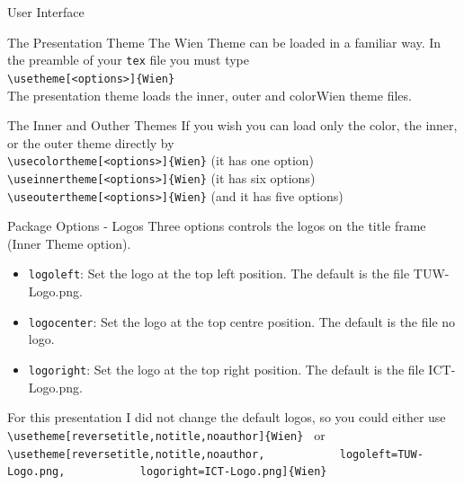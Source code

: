 \documentclass[aspectratio=169]{beamer}
\begin{document}
  
\begin{frame}{User Interface}
  \begin{block}{The Presentation Theme}
     The Wien Theme can be loaded in a familiar way. In the preamble
     of your {\tt tex} file you must type\\
     \vspace{5pt}  
    {\tt \textbackslash usetheme[<options>]\{Wien\}}\\ \vspace{5pt} 
    The presentation theme loads the inner, outer and colorWien theme files.
  \end{block}
  \begin{block}{The Inner and Outher Themes}
    If you wish you can load only the color, the inner, or the outer theme directly by\\ \vspace{5pt} 
    {\tt \textbackslash usecolortheme[<options>]\{Wien\}} (it has one option)\\ \vspace{5pt} 
    {\tt \textbackslash useinnertheme[<options>]\{Wien\}} (it has six options)\\ \vspace{5pt} 
    {\tt \textbackslash useoutertheme[<options>]\{Wien\}} (and it has five options)\\
  \end{block}
  
\end{frame}

\begin{frame}[fragile]{Package Options - Logos}
   Three options controls the logos on the title frame (Inner Theme option).
  
\begin{itemize}
\item \texttt{logoleft}: Set the logo at the top left position. The default is the file TUW-Logo.png.
\item \texttt{logocenter}: Set the logo at the top centre position. The default is the file no logo.
\item \texttt{logoright}: Set the logo at the top right position. The default is the file ICT-Logo.png.
\end{itemize}

For this presentation I did not change the default logos, so you could either use
\verb| \usetheme[reversetitle,notitle,noauthor]{Wien} |
or
\verb| \usetheme[reversetitle,notitle,noauthor,|
\verb|           logoleft=TUW-Logo.png,|
\verb|           logoright=ICT-Logo.png]{Wien} |


\end{frame}
\end{document}
